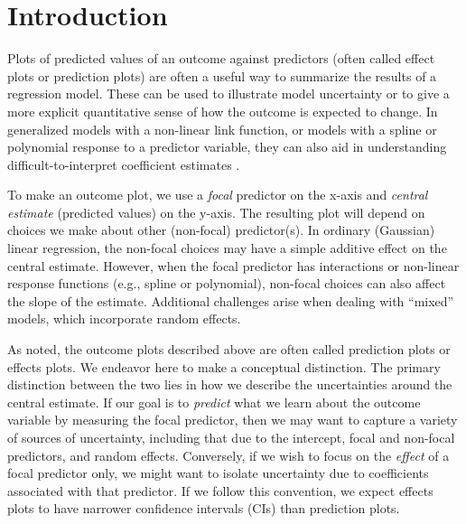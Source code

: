 
\linenumbers

\section{Introduction}

Plots of predicted values of an outcome against predictors (often called effect plots or prediction plots) are often a useful way to summarize the results of a regression model. These can be used to illustrate model uncertainty or to give a more explicit quantitative sense of how the outcome is expected to change. In generalized models with a non-linear link function, or models with a spline or polynomial response to a predictor variable, they can also aid in understanding difficult-to-interpret coefficient estimates \citep{brambor_understanding_2006, berry_improving_2012, leeper2017interpreting}. 

To make an outcome plot, we use a \emph{focal} predictor on the x-axis and \emph{central estimate} (predicted values) on the y-axis. The resulting plot will depend on choices we make about other (non-focal) predictor(s). In ordinary (Gaussian) linear regression, the non-focal choices may have a simple additive effect on the central estimate. However, when the focal predictor has interactions or non-linear response functions (e.g., spline or polynomial), non-focal choices can also affect the slope of the estimate. Additional challenges arise when dealing with “mixed” models, which incorporate random effects.

As noted, the outcome plots described above are often called prediction plots or effects plots. We endeavor here to make a conceptual distinction. 
The primary distinction between the two lies in how we describe the uncertainties around the central estimate. 
If our goal is to \emph{predict} what we learn about the outcome variable by measuring the focal predictor, then we may want to capture a variety of sources of uncertainty, including that due to the intercept, focal and non-focal predictors, and random effects.
Conversely, if we wish to focus on the \emph{effect} of a focal predictor only, we might want to isolate uncertainty due to coefficients associated with that predictor.
If we follow this convention, we expect effects plots to have narrower confidence intervals (CIs) than prediction plots.

